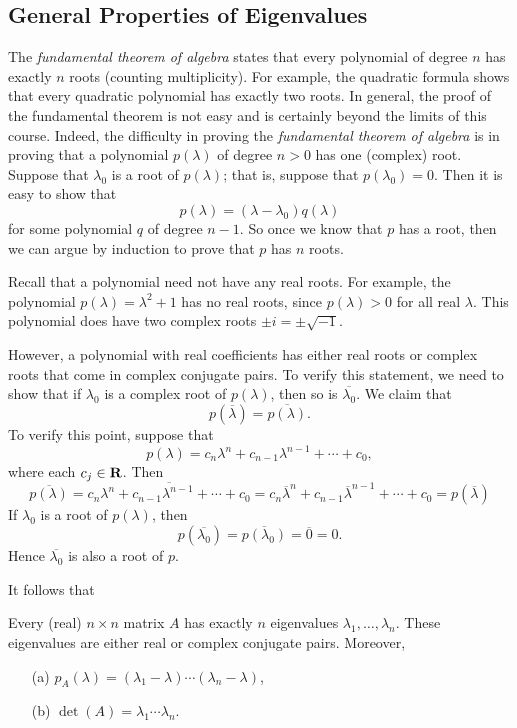 \documentclass{ximera}
\begin{document}
\subsection*{General Properties of Eigenvalues}

The {\em fundamental theorem of algebra\/}  states that every polynomial of degree $n$
has exactly $n$ roots (counting multiplicity).  For example, the 
quadratic formula shows that 
every quadratic polynomial has exactly two roots.  In general, the proof 
of the fundamental theorem is not easy and is certainly beyond the 
limits of this course.  Indeed, the difficulty in proving the {\em
fundamental theorem of algebra\/} is in proving that a
polynomial $p(\lambda)$ of degree $n>0$ has one (complex) root.
Suppose that $\lambda_0$ is a root of $p(\lambda)$; that is,
suppose that $p(\lambda_0)=0$. Then it is easy to show that
\begin{equation}  \label{e:factoring}
p(\lambda) = (\lambda-\lambda_0)q(\lambda)
\end{equation}
for some polynomial $q$ of degree $n-1$.  So once we know that
$p$ has a root, then we can argue by induction to prove that $p$
has $n$ roots.  

Recall that a polynomial need not have any real roots. For
example, the polynomial $p(\lambda)=\lambda^2+1$ has no real
roots, since $p(\lambda)> 0$ for all real $\lambda$.  This
polynomial does have two complex roots $\pm i =\pm\sqrt{-1}$.  

However, a polynomial with real coefficients has either real
roots or complex roots that come in complex conjugate pairs.  To
verify this statement, we need to show that if $\lambda_0$ is a
complex root of $p(\lambda)$, then so is $\overline{\lambda_0}$.
We claim that 
\[
p(\overline{\lambda})=\overline{p(\lambda)}.
\]
To verify this point, suppose that
\[
p(\lambda) = c_n\lambda^n + c_{n-1}\lambda^{n-1} + \cdots + c_0,
\]
where each $c_j\in\mbox{$\bf{R}$}$.  Then
\[
\overline{p(\lambda)}
=\overline{c_n\lambda^n + c_{n-1}\lambda^{n-1} + \cdots + c_0} 
= c_n\overline{\lambda}^n + c_{n-1}\overline{\lambda}^{n-1} + \cdots + c_0
= p(\overline{\lambda})
\]
If $\lambda_0$ is a root of $p(\lambda)$, then
\[
p(\overline{\lambda_0}) = \overline{p(\lambda_0)}=\overline{0}=0.
\]
Hence $\overline{\lambda_0}$ is also a root of $p$.

It follows that 
\begin{thm}  \label{T:eigens}
Every (real) $n\times n$ matrix $A$ has exactly $n$ eigenvalues
$\lambda_1,\ldots,\lambda_n$.  These eigenvalues are either real
or complex conjugate pairs.  Moreover,
\begin{enumerate}
\item[(a)] $p_A(\lambda) = (\lambda_1-\lambda)\cdots(\lambda_n-\lambda)$,
\item[(b)] $\det(A) = \lambda_1\cdots\lambda_n$.
\end{enumerate}
\end{thm} 
\end{document}
